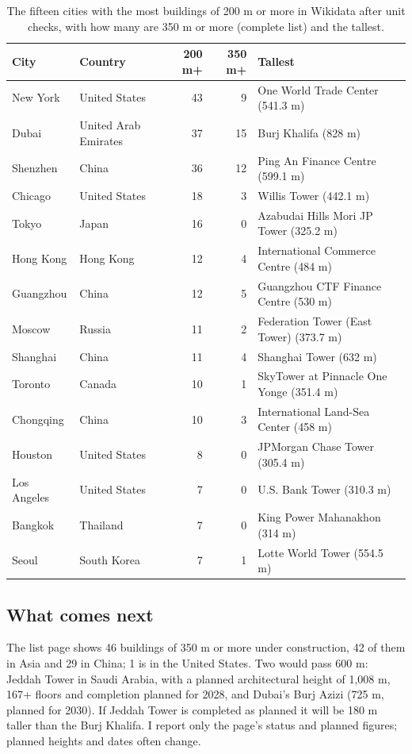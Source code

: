 \documentclass[11pt,a4paper]{article}
\begin{document}
\begin{table}[tbp]\centering\small\caption{The fifteen cities with the most buildings of 200 m or more in Wikidata after unit checks, with how many are 350 m or more (complete list) and the tallest.}\label{tab:top}\begin{tabular}{llrr>{\raggedright\arraybackslash}p{5.6cm}}\toprule City & Country & 200 m+ & 350 m+ & Tallest\\\midrule
New York & United States & 43 & 9 & One World Trade Center (541.3 m)\\
Dubai & United Arab Emirates & 37 & 15 & Burj Khalifa (828 m)\\
Shenzhen & China & 36 & 12 & Ping An Finance Centre (599.1 m)\\
Chicago & United States & 18 & 3 & Willis Tower (442.1 m)\\
Tokyo & Japan & 16 & 0 & Azabudai Hills Mori JP Tower (325.2 m)\\
Hong Kong & Hong Kong & 12 & 4 & International Commerce Centre (484 m)\\
Guangzhou & China & 12 & 5 & Guangzhou CTF Finance Centre (530 m)\\
Moscow & Russia & 11 & 2 & Federation Tower (East Tower) (373.7 m)\\
Shanghai & China & 11 & 4 & Shanghai Tower (632 m)\\
Toronto & Canada & 10 & 1 & SkyTower at Pinnacle One Yonge (351.4 m)\\
Chongqing & China & 10 & 3 & International Land-Sea Center (458 m)\\
Houston & United States & 8 & 0 & JPMorgan Chase Tower (305.4 m)\\
Los Angeles & United States & 7 & 0 & U.S. Bank Tower (310.3 m)\\
Bangkok & Thailand & 7 & 0 & King Power Mahanakhon (314 m)\\
Seoul & South Korea & 7 & 1 & Lotte World Tower (554.5 m)\\
\bottomrule\end{tabular}\end{table}

\subsection{What comes next}
The list page shows 46 buildings of 350 m or more under construction, 42 of them in Asia and 29 in China; 1 is in the United States. Two would pass 600 m: Jeddah Tower in Saudi Arabia, with a planned architectural height of 1,008 m, 167+ floors and completion planned for 2028, and Dubai's Burj Azizi (725 m, planned for 2030). If Jeddah Tower is completed as planned it will be 180 m taller than the Burj Khalifa. I report only the page's status and planned figures; planned heights and dates often change.
\end{document}
